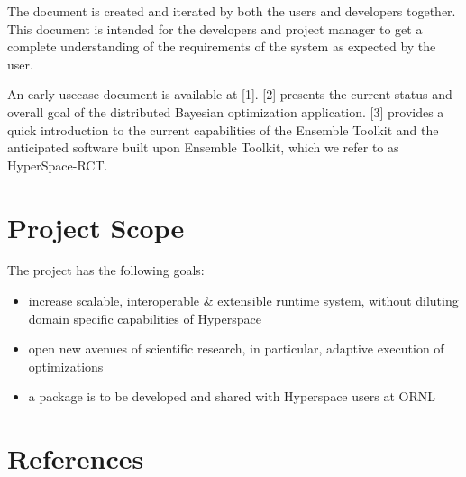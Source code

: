 \documentclass{scrreprt}
\begin{document}
The document is created and iterated by both the users and developers together. This document is intended for the developers and project manager to get a complete understanding of the requirements of the system as expected by the user.

An early usecase document is available at [1]. [2] presents the current status and overall goal of the distributed Bayesian optimization application. [3] provides a quick introduction to the current capabilities of the Ensemble Toolkit and the anticipated software built upon Ensemble Toolkit, which we refer to as HyperSpace-RCT. 

\section{Project Scope}

The project has the following goals:

\begin{itemize}[noitemsep]
\item increase scalable, interoperable & extensible runtime system, without diluting domain specific capabilities of Hyperspace
\item open new avenues of scientific research, in particular, adaptive execution of optimizations 
\item a package is to be developed and shared with Hyperspace users at ORNL
\end{itemize}

\section{References}

\end{document}
